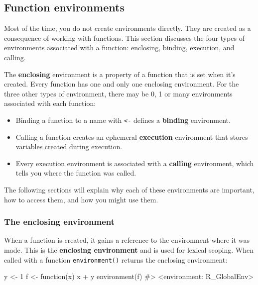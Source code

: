 \documentclass[oneside]{book}
\newenvironment{Shaded}{}{}
\newcommand{\KeywordTok} [1]{\textcolor[rgb]{0.00,0.44,0.13}{{#1}}}
\newcommand{\DecValTok}  [1]{\textcolor[rgb]{0.25,0.63,0.44}{{#1}}}
\newcommand{\StringTok}  [1]{\textcolor[rgb]{0.25,0.44,0.63}{{#1}}}
\newcommand{\CommentTok} [1]{\textcolor[rgb]{0.38,0.63,0.69}{{#1}}}
\newcommand{\NormalTok}  [1]{{#1}}
\begin{document}
\subsection{Function environments}\label{function-environments}

Most of the time, you do not create environments directly. They are
created as a consequence of working with functions. This section
discusses the four types of environments associated with a function:
enclosing, binding, execution, and calling.

The \textbf{enclosing} environment is a property of a function that is
set when it's created. Every function has one and only one enclosing
environment. For the three other types of environment, there may be 0, 1
or many environments associated with each function:

\begin{itemize}
\item
  Binding a function to a name with \texttt{\textless{}-} defines a
  \textbf{binding} environment.
\item
  Calling a function creates an ephemeral \textbf{execution} environment
  that stores variables created during execution.
\item
  Every execution environment is associated with a \textbf{calling}
  environment, which tells you where the function was called.
\end{itemize}

The following sections will explain why each of these environments are
important, how to access them, and how you might use them.

\subsubsection{The enclosing
environment}\label{the-enclosing-environment}

When a function is created, it gains a reference to the environment
where it was made. This is the \textbf{enclosing environment} and is
used for lexical scoping. When called with a function
\texttt{environment()} returns the enclosing environment:

\begin{Shaded}
\begin{Highlighting}[]
\NormalTok{y <-}\StringTok{ }\DecValTok{1}
\NormalTok{f <-}\StringTok{ }\NormalTok{function(x) x +}\StringTok{ }\NormalTok{y}
\KeywordTok{environment}\NormalTok{(f)}
\CommentTok{#> <environment: R_GlobalEnv>}
\end{Highlighting}
\end{Shaded}
\end{document}
